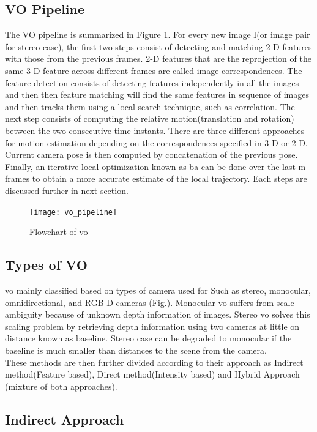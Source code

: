 \subsection{VO Pipeline}
The VO pipeline is summarized in Figure \ref{fig:flow}. For every new image I(or image pair for stereo case), the first two steps consist of detecting and matching 2-D features with those from the previous frames. 2-D features that are the reprojection of the same 3-D feature across different frames are called image correspondences. The feature detection consists of detecting features independently in all the images and then then feature matching will find the same features in sequence of images and then tracks them using a local search technique, such as correlation. The next step consists of computing the relative motion(translation and rotation) between the two consecutive time instants. There are three different approaches for motion estimation depending on the correspondences specified in 3-D or 2-D. Current camera pose is then computed by concatenation of the previous pose. Finally, an iterative local optimization known as \acrshort{ba} can be done over the last m frames to obtain a more accurate estimate of the local trajectory. Each steps are discussed further in next section.

\begin{figure}[h]
	\centering
	\texttt{[image: vo\_pipeline]}
	\caption{Flowchart of \acrshort{vo}}\cite{ScaramuzzaVO}
	\label{fig:flow}
\end{figure}

\subsection{Types of VO}

\acrshort{vo} mainly classified based on types of camera used for Such as stereo, monocular, omnidirectional, and RGB-D cameras (Fig.). Monocular \acrshort{vo} suffers from scale ambiguity because of unknown depth information of images. Stereo \acrshort{vo} solves this scaling problem by retrieving depth information using two cameras at little on distance known as baseline. Stereo case can be degraded to monocular if the baseline is much smaller than distances to the scene from the camera.\\
These methods are then further divided according to their approach as Indirect method(Feature based), Direct method(Intensity based) and Hybrid Approach (mixture of both approaches).

\subsection{Indirect Approach}

